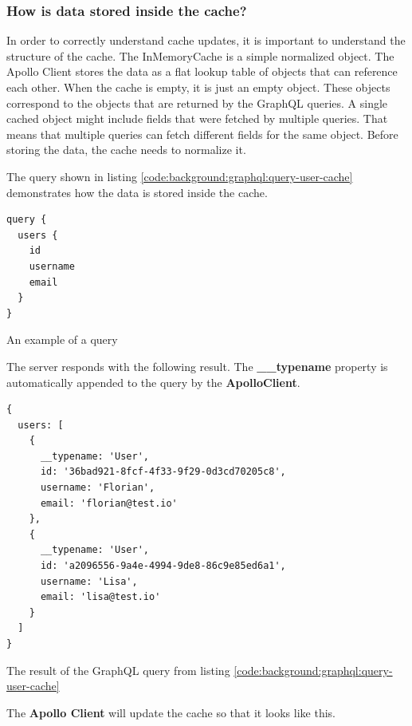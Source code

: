 \subsubsection{How is data stored inside the cache?}

In order to correctly understand cache updates, it is important to understand the structure of the cache. The InMemoryCache is a simple normalized object. The Apollo Client stores the data as a flat lookup table of objects that can reference each other. When the cache is empty, it is just an empty object. These objects correspond to the objects that are returned by the GraphQL queries. A single cached object might include fields that were fetched by multiple queries. That means that multiple queries can fetch different fields for the same object. Before storing the data, the cache needs to normalize it. \cite{misc:-:background:graphql:apollo-client-cache-overview}

The query shown in listing \ref{code:background:graphql:query-user-cache} demonstrates how the data is stored inside the cache.

\ifshowListings
\begin{listing}[H]
\begin{verbatim}
query {
  users {
    id
    username
    email
  }
}
\end{verbatim}
\caption{An example of a query}\label{code:background:graphql:query-user-cache}
\end{listing}
\fi

The server responds with the following result. The \textbf{\_\_typename} property is automatically appended to the query by the \textbf{ApolloClient}.

\ifshowListings
\begin{listing}[H]
\begin{verbatim}
{
  users: [
    {
      __typename: 'User',
      id: '36bad921-8fcf-4f33-9f29-0d3cd70205c8',
      username: 'Florian',
      email: 'florian@test.io'
    }, 
    {
      __typename: 'User',
      id: 'a2096556-9a4e-4994-9de8-86c9e85ed6a1',
      username: 'Lisa',
      email: 'lisa@test.io'
    }
  ]
}
\end{verbatim}
\caption{The result of the GraphQL query from listing \ref{code:background:graphql:query-user-cache}}\label{code:background:graphql:query-user-response-result}
\end{listing}
\fi

The \textbf{Apollo Client} will update the cache so that it looks like this.


